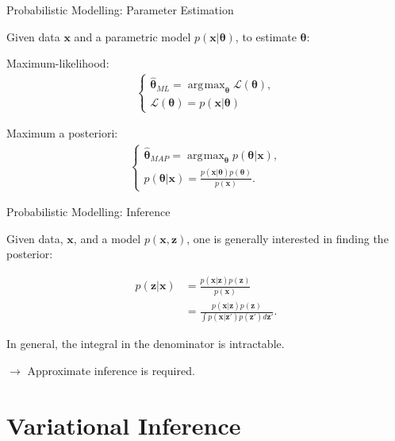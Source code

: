 \documentclass[12pt,ignorenonframetext,]{beamer}
\DeclareMathOperator*{\argmax}{\arg\!\max}
\begin{document}
\begin{frame}{Probabilistic Modelling: Parameter Estimation}
\protect\hypertarget{probabilistic-modelling-parameter-estimation}{}

Given data \(\bm{x}\) and a parametric model \(p(\bm{x}| \bm\theta)\),
to estimate \(\bm\theta\):

\pause

Maximum-likelihood: \begin{align*}
\begin{cases}
    \bm{\hat\theta}_{ML} = \argmax_{\bm{\theta}} \mathcal{L}(\bm{\theta}),\\
    \mathcal{L}(\bm{\theta}) = p(\bm{x} | \bm{\theta})
\end{cases}
\end{align*}

\pause

Maximum a posteriori: \begin{align*}
\begin{cases}
    \bm{\hat\theta}_{MAP} = \argmax_{\bm{\theta}} p(\bm{\theta} | \bm{x}),\\
    p(\bm{\theta} | \bm{x}) = \frac{p(\bm{x} |\bm{\theta})p(\bm{\theta})}{p(\bm{x})}.
\end{cases}
\end{align*}

\end{frame}

\begin{frame}{Probabilistic Modelling: Inference}
\protect\hypertarget{probabilistic-modelling-inference}{}

Given data, \(\bm{x}\), and a model \(p(\bm{x}, \bm{z})\), one is
generally interested in finding the posterior:

\pause

\begin{align*}
    p(\bm{z}|\bm{x}) &= \frac{p(\bm{x}|\bm{z})p(\bm{z})}{p(\bm{x})} \\
                     &= \frac{p(\bm{x}|\bm{z})p(\bm{z})}{\int p(\bm{x}|\bm{z'})p(\bm{z'}) d\bm{z'}}.
\end{align*}

\pause

In general, the integral in the denominator is intractable. 

\(\to\) Approximate inference is required.

\end{frame}

\hypertarget{variational-inference}{%
\section{Variational Inference}\label{variational-inference}}
\end{document}
